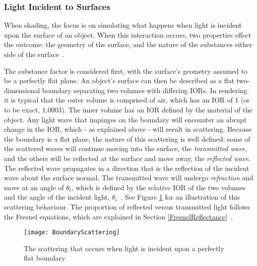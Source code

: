 \subsubsection{Light Incident to Surfaces}

When shading, the focus is on simulating what happens when light is incident upon the surface of an object. When this interaction occurs, two properties effect the outcome: the geometry of the surface, and the nature of the substances either side of the surface~\cite{RTR4, DiffuseSpecularAtSurfaces}.

The substance factor is considered first, with the surface's geometry assumed to be a perfectly flat plane. An object's surface can then be described as a flat two-dimensional boundary separating two volumes with differing IORs. In rendering it is typical that the outer volume is comprised of air, which has an IOR of 1 (or to be exact, 1.0003). The inner volume has an IOR defined by the material of the object. Any light wave that impinges on the boundary will encounter an abrupt change in the IOR, which - as explained above - will result in scattering. Because the boundary is a flat plane, the nature of this scattering is well defined: some of the scattered waves will continue moving into the surface, the \textit{transmitted wave}, and the others will be reflected at the surface and move away, the \textit{reflected wave}. The reflected wave propagates in a direction that is the reflection of the incident wave about the surface normal. The transmitted wave will undergo \textit{refraction} and move at an angle of \begin{math}\theta_t\end{math}, which is defined by the relative IOR of the two volumes and the angle of the incident light, \begin{math}\theta_i\end{math}~\cite{SnellsLaw}. See Figure \ref{fig:BoundaryScattering} for an illustration of this scattering behaviour. The proportion of reflected versus transmitted light follows the Fresnel equations, which are explained in Section \ref{FresnelReflectance}~\cite{PractitionersReflectionModels}.

\begin{figure}[h]
	\centering
	\texttt{[image: BoundaryScattering]}
	\caption{The scattering that occurs when light is incident upon a perfectly flat boundary}
	\label{fig:BoundaryScattering}
\end{figure}



